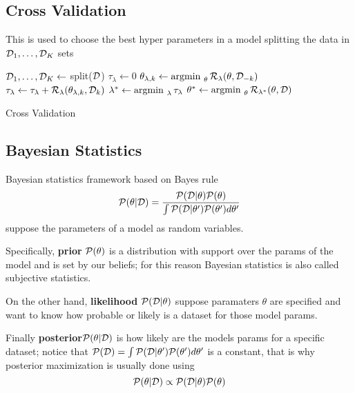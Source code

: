 \documentclass[../main.tex]{subfiles}
\begin{document}
\subsection{Cross Validation}
This is used to choose the best hyper parameters in a model splitting the data in $\mathcal{D}_1,\dots,\mathcal{D}_K$ sets
\begin{algorithm}[H]
\begin{algorithmic}
\State $\mathcal{D}_1,\dots,\mathcal{D}_K \leftarrow$ split($\mathcal{D}$)
\For{$\lambda \in \Lambda$}
    \State $\tau_\lambda \leftarrow 0$
        \State $\theta_{\lambda,k} \leftarrow \operatorname*{argmin\text{ }}_\theta \mathcal{R}_\lambda(\theta,\mathcal{D}_{-k})$
        \State $\tau_\lambda \leftarrow \tau_\lambda + \mathcal{R}_\lambda(\theta_{\lambda,k},\mathcal{D}_k)$
    \EndFor
\EndFor
\State $\lambda^* \leftarrow \operatorname*{argmin\text{ }}_\lambda \tau_\lambda$
\State $\theta^* \leftarrow \operatorname*{argmin\text{ }}_\theta \mathcal{R}_{\lambda^*}(\theta,\mathcal{D}) $
\end{algorithmic}
\caption{Cross Validation}
\end{algorithm}

\subsection{Bayesian Statistics}
Bayesian statistics framework based on Bayes rule
\begin{equation*}
    \mathcal{P}(\theta|\mathcal{D}) = \dfrac{\mathcal{P}(\mathcal{D}|\theta)\mathcal{P}(\theta)}{\int \mathcal{P}(\mathcal{D}|\theta')\mathcal{P}(\theta')d\theta'}
\end{equation*}
suppose the parameters of a model as random variables.

Specifically, \textbf{prior} $\mathcal{P}(\theta)$ is a distribution with support over the params of the model and is set by our beliefs; for this reason Bayesian statistics is also called subjective statistics.

On the other hand, \textbf{likelihood} $\mathcal{P}(\mathcal{D}|\theta)$ suppose paramaters $\theta$ are specified and want to know how probable or likely is a dataset for those model params.

Finally \textbf{posterior}$\mathcal{P}(\theta|\mathcal{D})$ is how likely are the models params for a specific dataset; notice that $\mathcal{P}(\mathcal{D}) = \int \mathcal{P}(\mathcal{D}|\theta')\mathcal{P}(\theta')d\theta'$ is a constant, that is why posterior maximization is usually done using 
\begin{equation*}
    \mathcal{P}(\theta|\mathcal{D}) \propto \mathcal{P}(\mathcal{D}|\theta)\mathcal{P}(\theta)
\end{equation*}
\end{document}
